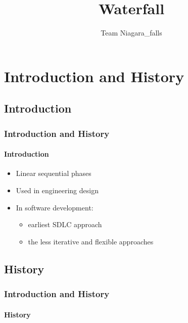 \documentclass[10pt]{beamer}
\title{Waterfall}
\author{Team Niagara\_falls}
\date{}
\begin{document}
\frame{\titlepage}
\begin{frame}
    \tableofcontents
\end{frame}



\section{Introduction and History}
\subsection{Introduction}
\begin{frame}
\frametitle{Introduction and History}
\framesubtitle{Introduction}
\begin{itemize}
    \item Linear sequential phases
    \item Used in engineering design
    \item In software development: 
    \begin{itemize}
        \item earliest SDLC approach
        \item the less iterative and flexible approaches
    \end{itemize}    
\end{itemize}
\end{frame}

\subsection{History}
\begin{frame}
\frametitle{Introduction and History}
\framesubtitle{History}
\startchronology
[startyear=1950,stopyear=1990]
\stopchronology
    
\end{frame}


\end{document}
